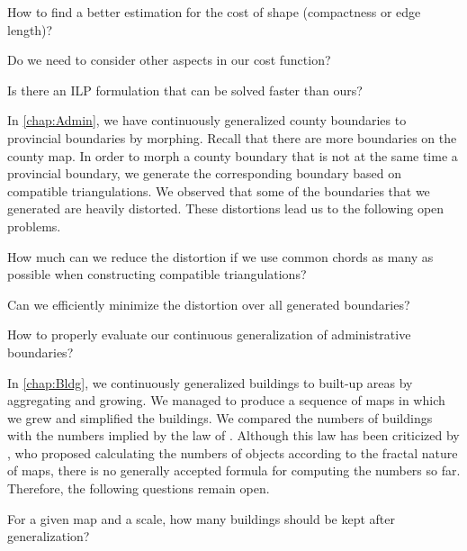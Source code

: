 \begin{open}
How to find a better estimation for the cost of shape 
(compactness or edge length)?
\end{open} 

\begin{open}
Do we need to consider other aspects in our cost function?
\end{open}

\begin{open}
Is there an ILP formulation that can be solved faster than ours?
\end{open}

In \chap\ref{chap:Admin}, 
we have continuously generalized 
county boundaries to provincial boundaries by morphing.
Recall that there are more boundaries on the county map.
In order to morph a county boundary 
that is not at the same time a provincial boundary,
we generate the corresponding boundary based on
compatible triangulations.
We observed that some of the boundaries 
that we generated are heavily distorted.  
These distortions lead us to the following open problems.

\begin{open}
  How much can we reduce the distortion 
  if we use common chords as many as possible
  when constructing compatible triangulations?
\end{open} 

\begin{open}
  Can we efficiently minimize the distortion 
  over all generated boundaries?
\end{open} 

\begin{open}
  How to properly evaluate our continuous generalization 
  of administrative boundaries?
\end{open}

In \chap\ref{chap:Bldg}, we continuously 
generalized buildings to built-up areas
by aggregating and growing.
We managed to produce a sequence of maps 
in which we grew and simplified the buildings.
We compared the numbers of buildings 
with the numbers implied 
by the law of \textcite{Topfer1966}.
Although this law has been criticized by 
\textcite{Jiang2015Fractal},
who proposed calculating the numbers of objects
according to the fractal nature of maps,
there is no generally accepted formula for 
computing the numbers so far.  
Therefore, the following questions remain open.

\begin{open}
  For a given map and a scale, 
  how many buildings should be kept after generalization?
\end{open}

